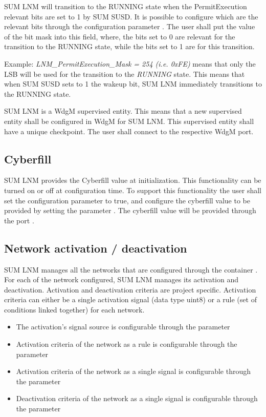 SUM LNM will transition to the RUNNING state when the PermitExecution relevant bits are set to 1 by SUM SUSD. It is possible to configure which are the relevant bits through the configuration parameter . The user shall put the value of the bit mask into this field, where, the bits set to 0 are relevant for the transition to the RUNNING state, while the bits set to 1 are  for this transition.


Example: \textit{LNM\_PermitExecution\_Mask = 254 (i.e. 0xFE)} means that only the LSB will be used for the transition to the \textit{RUNNING} state. This means that when SUM SUSD sets to 1 the wakeup bit, SUM LNM immediately transitions to the RUNNING state.


SUM LNM is a WdgM supervised entity. This means that a new supervised entity shall be configured in WdgM for SUM LNM. This supervised entity shall have a unique checkpoint. The user shall connect  to the respective WdgM port.

\subsection{Cyberfill}
SUM LNM provides the Cyberfill value at initialization. This functionality can be turned on or off at configuration time. To support this functionality the user shall set the configuration parameter  to true, and configure the cyberfill value to be provided by setting the parameter . The cyberfill value will be provided through the port .

\subsection{Network activation / deactivation}
\label{subsec:Network activation}
SUM LNM manages all the networks that are configured through the container . For each of the network configured, SUM LNM manages its activation and deactivation. Activation and deactivation criteria are project specific. Activation criteria can either be a single activation signal (data type uint8) or a rule (set of conditions linked together) for each network.

\begin{itemize}
\item The activation's signal source is configurable through the parameter 
\item Activation criteria of the network as a rule is configurable through the parameter \newline{}
\item Activation criteria of the network as a single signal is configurable through the parameter \newline{}
\item Deactivation criteria of the network as a single signal is configurable through the parameter 
\end{itemize}


